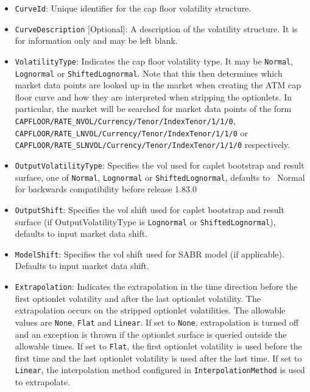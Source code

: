 \begin{itemize}
\item
\lstinline!CurveId!: Unique identifier for the cap floor volatility structure.

\item \lstinline!CurveDescription! [Optional]:
A description of the volatility structure. It is for information only and may be left blank.

\item \lstinline!VolatilityType!:
Indicates the cap floor volatility type. It may be \lstinline!Normal!, \lstinline!Lognormal! or \lstinline!ShiftedLognormal!. Note that this then determines which market data points are looked up in the market when creating the ATM cap floor curve and how they are interpreted when stripping the optionlets. In particular, the market will be searched for market data points of the form \lstinline!CAPFLOOR/RATE_NVOL/Currency/Tenor/IndexTenor/1/1/0!, \lstinline!CAPFLOOR/RATE_LNVOL/Currency/Tenor/IndexTenor/1/1/0! or \lstinline!CAPFLOOR/RATE_SLNVOL/Currency/Tenor/IndexTenor/1/1/0! respectively.

\item \lstinline!OutputVolatilityType!: Specifies the vol used for caplet bootstrap and result surface, one of {\tt Normal},
  {\tt Lognormal} or {\tt ShiftedLognormal}, defaults to {\ Normal} for backwards compatibility before release 1.83.0

\item \lstinline!OutputShift!: Specifies the vol shift used for caplet bootstrap and result surface (if OutputVolatilityType is 
{\tt Lognormal} or {\tt ShiftedLognormal}), defaults to input market data shift. 

\item \lstinline!ModelShift!: Specifies the vol shift used for SABR model (if applicable). Defaults to input market data shift. 

\item \lstinline!Extrapolation!:
Indicates the extrapolation in the time direction before the first optionlet volatility and after the last optionlet volatility. The extrapolation occurs on the stripped optionlet volatilities. The allowable values are \lstinline!None!, \lstinline!Flat! and \lstinline!Linear!. If set to \lstinline!None!, extrapolation is turned off and an exception is thrown if the optionlet surface is queried outside the allowable times. If set to \lstinline!Flat!, the first optionlet volatility is used before the first time and the last optionlet volatility is used after the last time. If set to \lstinline!Linear!, the interpolation method configured in \lstinline!InterpolationMethod! is used to extrapolate.


\end{itemize}
